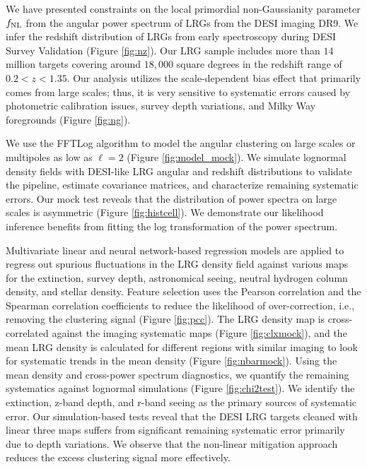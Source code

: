 We have presented constraints on the local primordial non-Gaussianity parameter $f_{\rm NL}$ from the angular power spectrum of LRGs from the DESI imaging DR9. We infer the redshift distribution of LRGs from early spectroscopy during DESI Survey Validation (Figure \ref{fig:nz}). Our LRG sample includes more than $14$ million targets covering around $18,000$ square degrees in the redshift range of $0.2< z < 1.35$. Our analysis utilizes the scale-dependent bias effect that primarily comes from large scales; thus, it is very sensitive to systematic errors caused by photometric calibration issues, survey depth variations, and Milky Way foregrounds (Figure \ref{fig:ng}). 

We use the FFTLog algorithm to model the angular clustering on large scales or multipoles as low as $\ell=2$ (Figure \ref{fig:model_mock}). We simulate lognormal density fields with DESI-like LRG angular and redshift distributions to validate the pipeline, estimate covariance matrices, and characterize remaining systematic errors. Our mock test reveals that the distribution of power spectra on large scales is asymmetric (Figure \ref{fig:histcell}). We demonstrate our likelihood inference benefits from fitting the log transformation of the power spectrum. 

Multivariate linear and neural network-based regression models are applied to regress out spurious fluctuations in the LRG density field against various maps for the extinction, survey depth, astronomical seeing, neutral hydrogen column density, and stellar density. Feature selection uses the Pearson correlation and the Spearman correlation coefficients to reduce the likelihood of over-correction, i.e., removing the clustering signal (Figure \ref{fig:pcc}). The LRG density map is cross-correlated against the imaging systematic maps (Figure \ref{fig:clxmock}), and the mean LRG density is calculated for different regions with similar imaging to look for systematic trends in the mean density (Figure \ref{fig:nbarmock}). Using the mean density and cross-power spectrum diagnostics, we quantify the remaining systematics against lognormal simulations (Figure \ref{fig:chi2test}). We identify the extinction, z-band depth, and r-band seeing as the primary sources of systematic error. Our simulation-based tests reveal that the DESI LRG targets cleaned with linear three maps suffers from significant remaining systematic error primarily due to depth variations. We observe that the non-linear mitigation approach reduces the excess clustering signal more effectively. 

